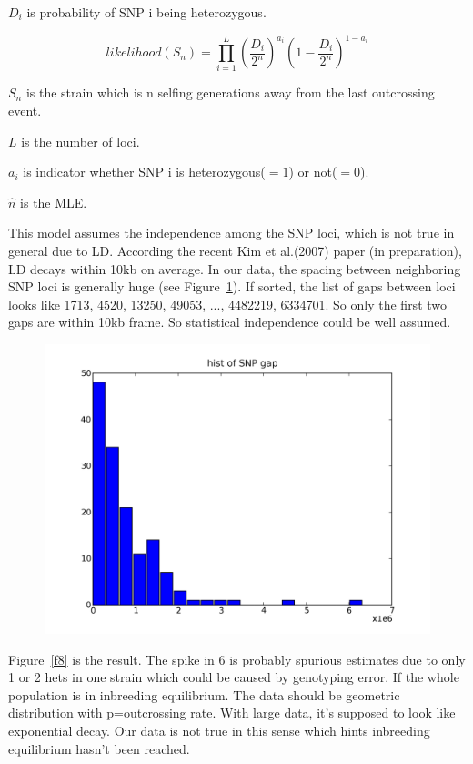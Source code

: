 \documentclass[a4paper,10pt]{article}
\begin{document}
$D_i$ is probability of SNP i being heterozygous.


\begin{equation}
likelihood(S_n) = \prod_{i=1}^L {(\frac{D_i}{2^n})}^{a_i} {(1-\frac{D_i}{2^n})}^{1-a_i}
\end{equation}

$S_n$ is the strain which is n selfing generations away from the last outcrossing event.

$L$ is the number of loci.

$a_i$ is indicator whether SNP i is heterozygous($=1$) or not($=0$).

$\hat{n}$ is the MLE.

This model assumes the independence among the SNP loci, which is not true in general due to LD. According the recent Kim et al.(2007) paper (in preparation), LD decays within 10kb on average. In our data, the spacing between neighboring SNP loci is generally huge (see Figure~\ref{f7}). If sorted, the list of gaps between loci looks like 1713, 4520, 13250, 49053, ..., 4482219, 6334701. So only the first two gaps are within 10kb frame. So statistical independence could be well assumed.

\begin{figure}
\includegraphics[width=1\textwidth]{figures/snp_locus_gap_hist.png}
\caption{}\label{f7}
\end{figure}

Figure~\ref{f8} is the result. The spike in 6 is probably spurious estimates due to only 1 or 2 hets in one strain which could be caused by genotyping error. If the whole population is in inbreeding equilibrium. The data should be geometric distribution with p=outcrossing rate. With large data, it's supposed to look like exponential decay. Our data is not true in this sense which hints inbreeding equilibrium hasn't been reached.
\end{document}

